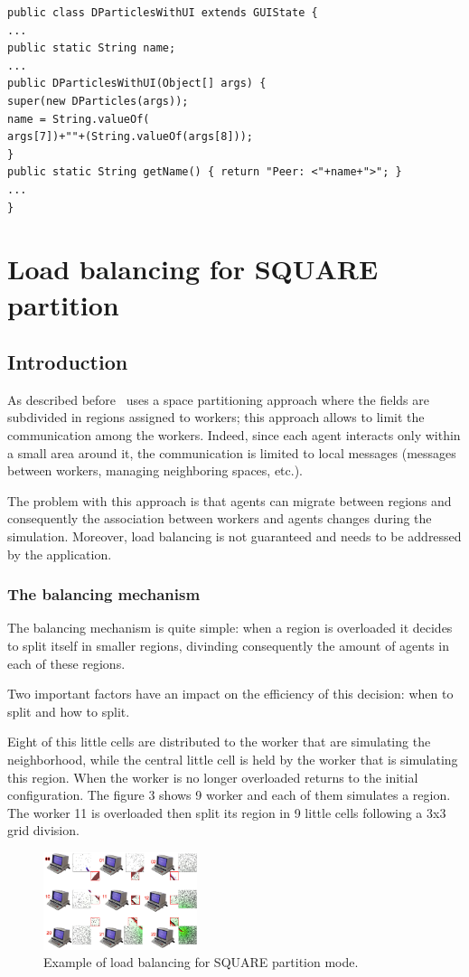 \documentclass{book}
\begin{document}
\begin{lstlisting}
public class DParticlesWithUI extends GUIState {
...
public static String name;
...
public DParticlesWithUI(Object[] args) {
super(new DParticles(args));
name = String.valueOf(
args[7])+""+(String.valueOf(args[8]));
}
public static String getName() { return "Peer: <"+name+">"; }
...
}
\end{lstlisting}

\chapter{Load balancing for SQUARE partition}

\section{Introduction}
As described before \dm\ uses a space partitioning approach where the fields are subdivided in regions assigned to workers; this approach allows to limit the communication among the workers. Indeed, since each agent interacts only within a small area around it, the communication is limited to local messages (messages between workers, managing neighboring spaces, etc.). 

The problem with this approach is that agents can migrate between regions and consequently the association between workers and agents changes during the simulation. Moreover, load balancing is not guaranteed and needs to be addressed by the application.

\subsection{The balancing mechanism}
The balancing mechanism is quite simple: when a region is overloaded it decides to split itself in smaller regions, divinding consequently the amount of agents in each of these regions. 

Two important factors have an impact on the efficiency of this decision: when to split and how to split.



Eight of this little cells are distributed to the worker that are simulating the neighborhood, while the central little cell is held by the worker that is simulating this region. When the worker is no longer overloaded returns to the initial configuration.
The figure 3 shows 9 worker and each of them simulates a region. The worker 11 is overloaded then split its region in 9 little cells following a 3x3 grid division.
\begin{figure}
\centering
\includegraphics[width=0.4\textwidth, bb=0 0 1302 827]{LoadBalancing.png}
\caption{Example of load balancing for SQUARE partition mode.}
\end{figure}
\end{document}

